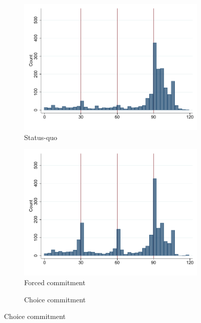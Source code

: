 \documentclass[oneside,11pt]{article}
\begin{document}
\begin{figure}[H]
    \caption{Histogram of payments}
    \label{hist_payments}
    \begin{center}
    \begin{subfigure}{0.31\textwidth}
        \caption{Status-quo}
        \centering
        \includegraphics[width=\textwidth]{Figuras/hist_payments_sq.pdf}
    \end{subfigure}
    \begin{subfigure}{0.31\textwidth}
        \caption{Forced commitment}
        \centering
        \includegraphics[width=\textwidth]{Figuras/hist_payments_fc.pdf}
    \end{subfigure}
    \begin{subfigure}{0.31\textwidth}
        \caption{Choice commitment}

\end{subfigure}
\end{center}
\end{figure}
\end{document}
